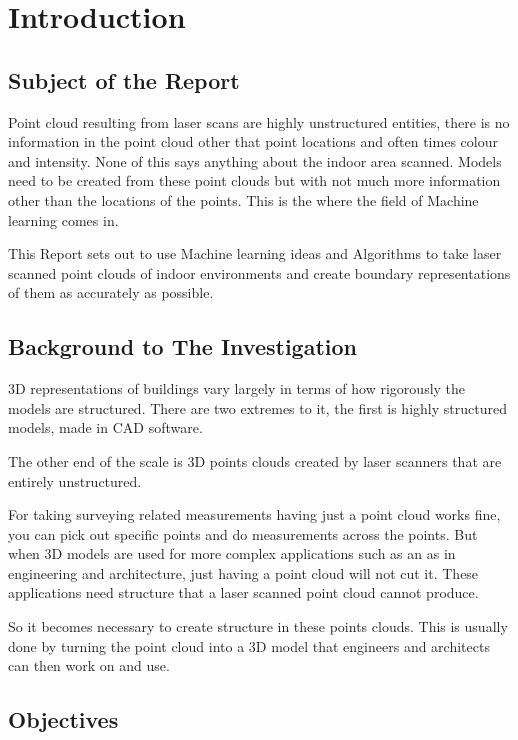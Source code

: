 
\chapter{Introduction}
	
	\section{Subject of the Report}
	
		Point cloud resulting from laser scans are highly unstructured entities, there is no information in the point cloud other that point locations and often times colour and intensity. None of this says anything about the indoor area scanned. Models need to be created from these point clouds but with not much more information other than the locations of the points. This is the where the field of Machine learning comes in.
		
		This Report sets out to use Machine learning ideas and Algorithms to take laser scanned point clouds of indoor environments and create boundary representations of them as accurately as possible.
	
	\section{Background to The Investigation}
	
		3D representations of buildings vary largely in terms of how rigorously the models are structured. There are two extremes to it, the first is highly structured models, made in CAD software.
		
		The other end of the scale is 3D points clouds created by laser scanners that are entirely unstructured.
		
		For taking surveying related measurements having just a point cloud works fine, you can pick out specific points and do measurements across the points. But when 3D models are used for more complex applications such as an as in engineering and architecture, just having a point cloud will not cut it. These applications need structure that a laser scanned point cloud cannot produce.
		
		So it becomes necessary to create structure in these points clouds. This is usually done by turning the point cloud into a 3D model that engineers and architects can then work on and use.
		
	\section{Objectives}
	
